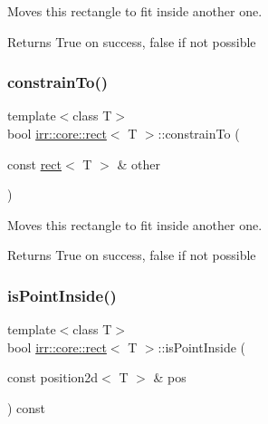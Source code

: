 Moves this rectangle to fit inside another one. 

\begin{DoxyReturn}{Returns}
True on success, false if not possible 
\end{DoxyReturn}
\mbox{\label{classirr_1_1core_1_1rect_a4515d2a1349dc805775854a422465f63}} 
\subsubsection{\texorpdfstring{constrain\+To()}{constrainTo()}\hspace{0.1cm}{\footnotesize\ttfamily [2/2]}}
{\footnotesize\ttfamily template$<$class T$>$ \\
bool \hyperlink{classirr_1_1core_1_1rect}{irr\+::core\+::rect}$<$ T $>$\+::constrain\+To (\begin{DoxyParamCaption}\item[{const \hyperlink{classirr_1_1core_1_1rect}{rect}$<$ T $>$ \&}]{other }\end{DoxyParamCaption})\hspace{0.3cm}{\ttfamily [inline]}}



Moves this rectangle to fit inside another one. 

\begin{DoxyReturn}{Returns}
True on success, false if not possible 
\end{DoxyReturn}
\mbox{\label{classirr_1_1core_1_1rect_a34c84ad8ff423a4b657eedbcd112afb3}} 
\subsubsection{\texorpdfstring{is\+Point\+Inside()}{isPointInside()}\hspace{0.1cm}{\footnotesize\ttfamily [1/2]}}
{\footnotesize\ttfamily template$<$class T$>$ \\
bool \hyperlink{classirr_1_1core_1_1rect}{irr\+::core\+::rect}$<$ T $>$\+::is\+Point\+Inside (\begin{DoxyParamCaption}\item[{const position2d$<$ T $>$ \&}]{pos }\end{DoxyParamCaption}) const\hspace{0.3cm}{\ttfamily [inline]}}



